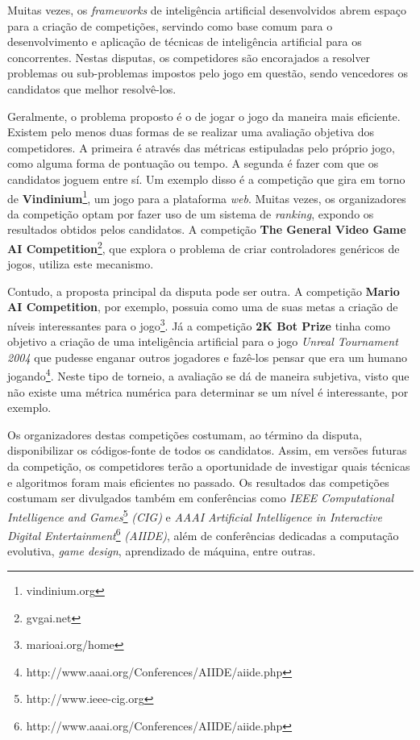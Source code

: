 Muitas vezes, os \textit{frameworks} de inteligência artificial desenvolvidos
abrem espaço para a criação de competições, servindo como base comum para o
desenvolvimento e aplicação de técnicas de inteligência artificial para os
concorrentes. Nestas disputas, os competidores são encorajados a resolver
problemas ou sub-problemas impostos pelo jogo em questão, sendo vencedores os
candidatos que melhor resolvê-los.

Geralmente, o problema proposto é o de jogar o jogo da maneira mais eficiente.
Existem pelo menos duas formas de se realizar uma avaliação objetiva dos
competidores. A primeira é através das métricas estipuladas pelo próprio jogo,
como alguma forma de pontuação ou tempo. A segunda é fazer com que os candidatos
joguem entre sí. Um exemplo disso é a competição que gira em torno de
\textbf{Vindinium}\footnote{vindinium.org}, um jogo para a plataforma
\textit{web}. Muitas vezes, os organizadores da competição optam por fazer uso
de um sistema de \textit{ranking}, expondo os resultados obtidos pelos
candidatos. A competição \textbf{The General Video Game AI
Competition}\footnote{gvgai.net}, que explora o problema de criar controladores
genéricos de jogos, utiliza este mecanismo.

Contudo, a proposta principal da disputa pode ser outra. A competição
\textbf{Mario AI Competition}, por exemplo, possuia como uma de suas metas a
criação de níveis interessantes para o jogo\footnote{marioai.org/home}. Já a
competição \textbf{2K Bot Prize} tinha como objetivo a criação de uma
inteligência artificial para o jogo \textit{Unreal Tournament 2004} que pudesse
enganar outros jogadores e fazê-los pensar que era um humano
jogando\footnote{http://www.aaai.org/Conferences/AIIDE/aiide.php}. Neste tipo
de torneio, a avaliação se dá de maneira subjetiva, visto que não existe uma
métrica numérica para determinar se um nível é interessante, por exemplo.

Os organizadores destas competições costumam, ao término da disputa,
disponibilizar os códigos-fonte de todos os candidatos. Assim, em versões
futuras da competição, os competidores terão a oportunidade de investigar quais
técnicas e algoritmos foram mais eficientes no passado. Os resultados das
competições costumam ser divulgados também em conferências como \textit{IEEE
Computational Intelligence and Games}\footnote{http://www.ieee-cig.org}
\textit{(CIG)} e \textit{AAAI Artificial Intelligence in Interactive Digital
Entertainment}\footnote{http://www.aaai.org/Conferences/AIIDE/aiide.php}
\textit{(AIIDE)}, além de conferências dedicadas a computação evolutiva,
\textit{game design}, aprendizado de máquina, entre outras.



